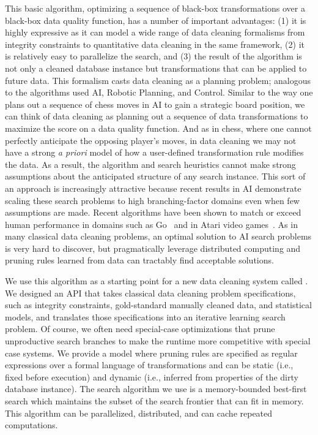 This basic algorithm, optimizing a sequence of black-box transformations over a black-box data quality function, has a number of important advantages: (1) it is highly expressive as it can model a wide range of data cleaning formalisms from integrity constraints to quantitative data cleaning in the same framework, (2) it is relatively easy to parallelize the search, and (3) the result of the algorithm is not only a cleaned database instance but transformations that can be applied to future data.
This formalism casts data cleaning as a planning problem; analogous to the algorithms used AI, Robotic Planning, and Control.
Similar to the way one plans out a sequence of chess moves in AI to gain a strategic board position, we can think of data cleaning as planning out a sequence of data transformations to maximize the score on a data quality function.
And as in chess, where one cannot perfectly anticipate the opposing player's moves, in data cleaning we may not have a strong \emph{a priori} model of how a user-defined transformation rule modifies the data.
As a result, the algorithm and search heuristics cannot make strong assumptions about the anticipated structure of any search instance.
This sort of an approach is increasingly attractive because recent results in AI demonstrate scaling these search problems to  high branching-factor domains even when few assumptions are made.
Recent algorithms have been shown to match or exceed human performance in domains such as Go~\cite{silver2016mastering} and in Atari video games~\cite{mnih2015human}.
As in many classical data cleaning problems, an optimal solution to AI search problems is very hard to discover, but pragmatically leverage distributed computing and pruning rules learned from data can tractably find acceptable solutions.

We use this algorithm as a starting point for a new data cleaning system called \sys.
We designed an API that takes classical data cleaning problem specifications, such as integrity constraints, gold-standard manually cleaned data, and statistical models, and translates those specifications into an iterative learning search problem. 
Of course, we often need special-case optimizations that prune unproductive search branches to make the runtime more competitive with special case systems.
We provide a model where pruning rules are specified as regular expressions over a formal language of transformations and can be static (i.e., fixed before execution) and dynamic (i.e., inferred from properties of the dirty database instance).
The search algorithm we use is a memory-bounded best-first search which maintains the subset of the search frontier that can fit in memory. 
This algorithm can be parallelized, distributed, and can cache repeated computations.

